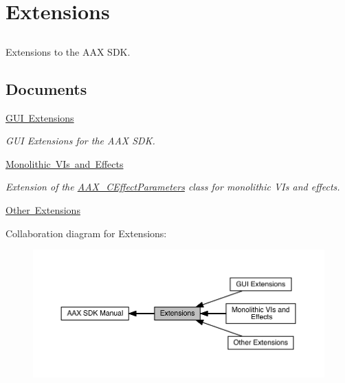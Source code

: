 \hypertarget{a00837}{}\section{Extensions}
\label{a00837}


\subsection{ }
Extensions to the A\+AX S\+DK. 

\subsection*{Documents}
\begin{DoxyCompactItemize}
\item 
\mbox{\hyperlink{a00838}{G\+U\+I Extensions}}
\begin{DoxyCompactList}\small\item\em G\+UI Extensions for the A\+AX S\+DK. \end{DoxyCompactList}\item 
\mbox{\hyperlink{a00839}{Monolithic V\+Is and Effects}}
\begin{DoxyCompactList}\small\item\em Extension of the \mbox{\hyperlink{a01481}{A\+A\+X\+\_\+\+C\+Effect\+Parameters}} class for monolithic V\+Is and effects. \end{DoxyCompactList}\item 
\mbox{\hyperlink{a00840}{Other Extensions}}
\end{DoxyCompactItemize}
Collaboration diagram for Extensions\+:
\nopagebreak
\begin{figure}[H]
\begin{center}
\leavevmode
\includegraphics[width=350pt]{a00837}
\end{center}
\end{figure}
